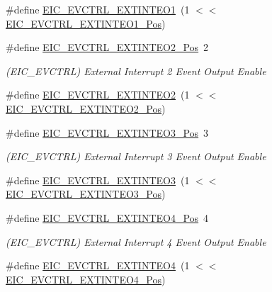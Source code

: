 \begin{DoxyCompactItemize}
\#define \mbox{\hyperlink{group___s_a_m_d21___e_i_c_gaeaf96f2784c24d3db55f93543d6f4c61}{E\+I\+C\+\_\+\+E\+V\+C\+T\+R\+L\+\_\+\+E\+X\+T\+I\+N\+T\+E\+O1}}~(1 $<$$<$ \mbox{\hyperlink{group___s_a_m_d21___e_i_c_ga52b37e5d5286cd75a1f4f750c2aaaa36}{E\+I\+C\+\_\+\+E\+V\+C\+T\+R\+L\+\_\+\+E\+X\+T\+I\+N\+T\+E\+O1\+\_\+\+Pos}})
\item 
\#define \mbox{\hyperlink{group___s_a_m_d21___e_i_c_ga33d2db9ec5aef407e5c355b9ffe81c27}{E\+I\+C\+\_\+\+E\+V\+C\+T\+R\+L\+\_\+\+E\+X\+T\+I\+N\+T\+E\+O2\+\_\+\+Pos}}~2
\begin{DoxyCompactList}\small\item\em (E\+I\+C\+\_\+\+E\+V\+C\+T\+RL) External Interrupt 2 Event Output Enable \end{DoxyCompactList}\item 
\#define \mbox{\hyperlink{group___s_a_m_d21___e_i_c_ga3e4b3c7c9348c940b1b7f90efb07990e}{E\+I\+C\+\_\+\+E\+V\+C\+T\+R\+L\+\_\+\+E\+X\+T\+I\+N\+T\+E\+O2}}~(1 $<$$<$ \mbox{\hyperlink{group___s_a_m_d21___e_i_c_ga33d2db9ec5aef407e5c355b9ffe81c27}{E\+I\+C\+\_\+\+E\+V\+C\+T\+R\+L\+\_\+\+E\+X\+T\+I\+N\+T\+E\+O2\+\_\+\+Pos}})
\item 
\#define \mbox{\hyperlink{group___s_a_m_d21___e_i_c_ga958d9ba364c218a57206251cda93b075}{E\+I\+C\+\_\+\+E\+V\+C\+T\+R\+L\+\_\+\+E\+X\+T\+I\+N\+T\+E\+O3\+\_\+\+Pos}}~3
\begin{DoxyCompactList}\small\item\em (E\+I\+C\+\_\+\+E\+V\+C\+T\+RL) External Interrupt 3 Event Output Enable \end{DoxyCompactList}\item 
\#define \mbox{\hyperlink{group___s_a_m_d21___e_i_c_ga874e53ebba2e0877a5885c2329537ac8}{E\+I\+C\+\_\+\+E\+V\+C\+T\+R\+L\+\_\+\+E\+X\+T\+I\+N\+T\+E\+O3}}~(1 $<$$<$ \mbox{\hyperlink{group___s_a_m_d21___e_i_c_ga958d9ba364c218a57206251cda93b075}{E\+I\+C\+\_\+\+E\+V\+C\+T\+R\+L\+\_\+\+E\+X\+T\+I\+N\+T\+E\+O3\+\_\+\+Pos}})
\item 
\#define \mbox{\hyperlink{group___s_a_m_d21___e_i_c_gaeac161558062b840314749c4ef010b3b}{E\+I\+C\+\_\+\+E\+V\+C\+T\+R\+L\+\_\+\+E\+X\+T\+I\+N\+T\+E\+O4\+\_\+\+Pos}}~4
\begin{DoxyCompactList}\small\item\em (E\+I\+C\+\_\+\+E\+V\+C\+T\+RL) External Interrupt 4 Event Output Enable \end{DoxyCompactList}\item 
\#define \mbox{\hyperlink{group___s_a_m_d21___e_i_c_ga9fd28e59e149d809defd4daf94ffbe58}{E\+I\+C\+\_\+\+E\+V\+C\+T\+R\+L\+\_\+\+E\+X\+T\+I\+N\+T\+E\+O4}}~(1 $<$$<$ \mbox{\hyperlink{group___s_a_m_d21___e_i_c_gaeac161558062b840314749c4ef010b3b}{E\+I\+C\+\_\+\+E\+V\+C\+T\+R\+L\+\_\+\+E\+X\+T\+I\+N\+T\+E\+O4\+\_\+\+Pos}})

\end{DoxyCompactItemize}
